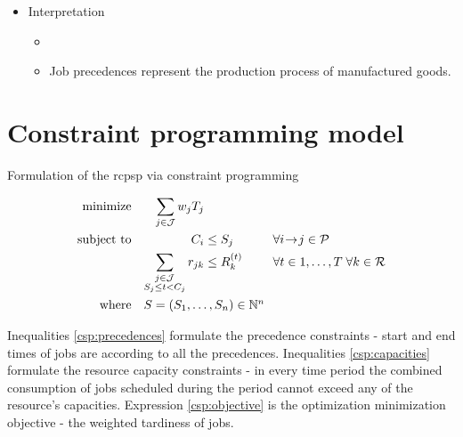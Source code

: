 \begin{itemize}
\begin{table}
        \caption{Scheduling notation}
        \label{tab:SchedulingNotation}
    \end{table}

    \item Interpretation
    \begin{itemize}
        \item {}
        \item Job precedences represent the production process of manufactured goods.
    \end{itemize}
\end{itemize}

\section{Constraint programming model}

Formulation of the \ac{rcpsp} via constraint programming


\begin{align}
    \text{minimize}   && \sum_{j \in \Jobs} \tardinessweight{j} \tardiness{j}                                 &                      &&                                              \label{csp:objective} \\
    \text{subject to} && \jobend{i}                                                                           & \leq \jobstart{j}    && \forall \precedence{i}{j} \in \Precedences   \label{csp:precedences} \\
                      && \sum_{\substack{j \in \Jobs \\ \jobstart{j} \leq t < \jobend{j}}} \consumption{j}{k} & \leq \capacity{k}{t} && \forall t \in 1, \dots, \horizon \; \forall k \in \Resources \label{csp:capacities} \\
    \text{where}      && \multispan3{$ \Schedule = (\jobstart{1}, \dots, \jobstart{n}) \in \N^n $ \hfill}                                                                            \nonumber
\end{align}

Inequalities \eqref{csp:precedences} formulate the precedence constraints - start and end times of jobs
are according to all the precedences.
Inequalities \eqref{csp:capacities} formulate the resource capacity constraints - in every time period
the combined consumption of jobs scheduled during the period cannot exceed any of the resource's capacities.
Expression \eqref{csp:objective} is the optimization minimization objective - the weighted tardiness of jobs.


